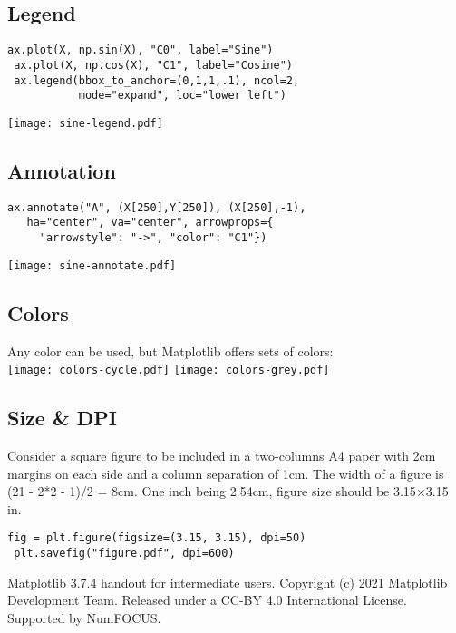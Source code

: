 \documentclass[10pt,landscape,a4paper]{article}
\begin{document}
\begin{multicols*}{3}
\subsection*{\rmfamily Legend}
\begin{lstlisting}[]
 ax.plot(X, np.sin(X), "C0", label="Sine")
 ax.plot(X, np.cos(X), "C1", label="Cosine")
 ax.legend(bbox_to_anchor=(0,1,1,.1), ncol=2,
           mode="expand", loc="lower left")
\end{lstlisting}
\texttt{[image: sine-legend.pdf]}

\subsection*{\rmfamily Annotation}
\begin{lstlisting}[]
 ax.annotate("A", (X[250],Y[250]), (X[250],-1),
   ha="center", va="center", arrowprops={
     "arrowstyle": "->", "color": "C1"})
\end{lstlisting}
\texttt{[image: sine-annotate.pdf]}

\subsection*{\rmfamily Colors}

Any color can be used, but Matplotlib offers sets of colors:\\
\texttt{[image: colors-cycle.pdf]} \smallskip
\texttt{[image: colors-grey.pdf]}\\

\vspace{-1em}
\subsection*{\rmfamily Size \& DPI}

Consider a square figure to be included in a two-columns A4 paper with
2cm margins on each side and a column separation of 1cm. The width of
a figure is (21 - 2*2 - 1)/2 = 8cm. One inch being 2.54cm, figure size
should be 3.15$\times$3.15 in.
\begin{lstlisting}[]
 fig = plt.figure(figsize=(3.15, 3.15), dpi=50)
 plt.savefig("figure.pdf", dpi=600)
\end{lstlisting}


\vfill
%
{\scriptsize
  Matplotlib 3.7.4 handout for intermediate users.
  Copyright (c) 2021 Matplotlib Development Team.
  Released under a CC-BY 4.0 International License.
  Supported by NumFOCUS.
\par}



\end{multicols*}
\end{document}
